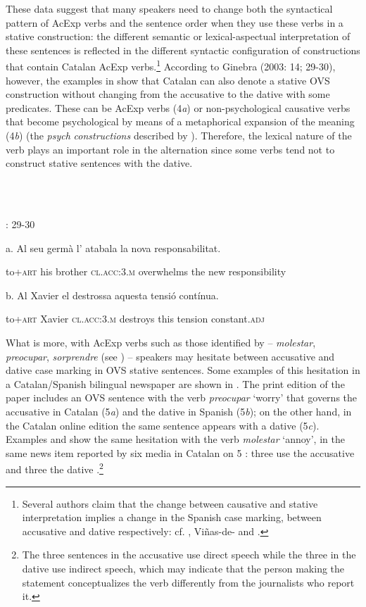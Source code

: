 \documentclass[output=paper,modfonts,nonflat]{langsci/langscibook}
\begin{document}
These data suggest that many speakers need to change both the syntactical pattern of AcExp verbs and the sentence order when they use these verbs in a stative construction: the different semantic or lexical-aspectual interpretation of these sentences is reflected in the different syntactic configuration of constructions that contain Catalan AcExp verbs.\footnote{Several authors claim that the change between causative and stative interpretation implies a change in the Spanish case marking, between accusative and dative respectively: cf. \citet{Fábregas2015}, Viñas-de-\citet{Puig2017} and \citet{Ganeshan2019}.} According to Ginebra (2003: 14; 29-30), however, the examples in  show that Catalan can also denote a stative OVS construction without changing from the accusative to the dative with some predicates. These can be AcExp verbs (4\textit{a}) or non-psychological causative verbs that become psychological by means of a metaphorical expansion of the meaning (4\textit{b}) (the \textit{psych} \textit{constructions} described by \citealt{Bouchard1995}). Therefore, the lexical nature of the verb plays an important role in the alternation since some verbs tend not to construct stative sentences with the dative.

\ea%
    \label{ex:key:4}
    \gll\\
        \\
    \glt
    \z

         \citealt{Ginebra2003}: 29-30

      a. Al         seu germà  l’                 atabala         la   nova responsabilitat.

          to+\textsc{art} his brother \textsc{cl.acc:3.m} overwhelms the new  responsibility

      b. Al         Xavier el                 destrossa aquesta tensió   contínua.

          to+\textsc{art} Xavier \textsc{cl.acc:3.m} destroys   this       tension constant.\textsc{adj}

What is more, with AcExp verbs such as those identified by \citet{CabréMateu1998} – \textit{molestar}, \textit{preocupar}, \textit{sorprendre} (see ) – speakers may hesitate between accusative and dative case marking in OVS stative sentences. Some examples of this hesitation in a Catalan/Spanish bilingual newspaper are shown in . The print edition of the paper includes an OVS sentence with the verb \textit{preocupar} ‘worry’ that governs the accusative in Catalan (5\textit{a}) and the dative in Spanish (5\textit{b}); on the other hand, in the Catalan online edition the same sentence appears with a dative (5\textit{c}). Examples  and  show the same hesitation with the verb \textit{molestar} ‘annoy’, in the same news item reported by six media in Catalan on 5 \citealt{December2012}: three use the accusative  and three the dative .\footnote{The three sentences in the accusative use direct speech while the three in the dative use indirect speech, which may indicate that the person making the statement conceptualizes the verb differently from the journalists who report it.}
\end{document}
